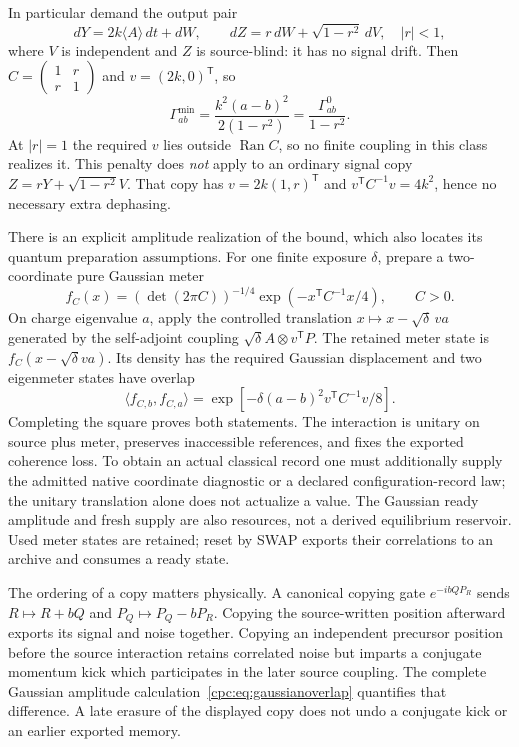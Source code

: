 \documentclass[11pt,oneside,openany]{book}
\theoremstyle{definition}
\theoremstyle{remark}\newtheorem{remark}[theorem]{Remark}
\begin{document}
In particular demand the output pair
\begin{equation}
 dY=2k\langle A\rangle\,dt+dW,\qquad
 dZ=r\,dW+\sqrt{1-r^2}\,dV,
 \quad |r|<1,
 \label{cpc:eq:sourceblind}
\end{equation}
where $V$ is independent and $Z$ is source-blind: it has no signal drift. Then
$C=\left(\begin{smallmatrix}1&r\\r&1\end{smallmatrix}\right)$ and $v=(2k,0)^{\mathsf T}$, so
\begin{equation}
 \Gamma_{ab}^{\min}=\frac{k^2(a-b)^2}{2(1-r^2)}
 =\frac{\Gamma_{ab}^{0}}{1-r^2}.
 \label{cpc:eq:blindcost}
\end{equation}
At $|r|=1$ the required $v$ lies outside $\operatorname{Ran}C$, so no finite coupling in this class realizes it. This penalty does \emph{not} apply to an ordinary signal copy $Z=rY+\sqrt{1-r^2}V$. That copy has $v=2k(1,r)^{\mathsf T}$ and $v^{\mathsf T}C^{-1}v=4k^2$, hence no necessary extra dephasing.

There is an explicit amplitude realization of the bound, which also locates its quantum preparation assumptions. For one finite exposure $\delta$, prepare a two-coordinate pure Gaussian meter
\[
 f_C(x)=(\det(2\pi C))^{-1/4}\exp(-x^{\mathsf T}C^{-1}x/4),\qquad C>0.
\]
On charge eigenvalue $a$, apply the controlled translation $x\mapsto x-\sqrt\delta\,va$ generated by the self-adjoint coupling $\sqrt\delta A\otimes v^{\mathsf T}P$. The retained meter state is $f_C(x-\sqrt\delta va)$. Its density has the required Gaussian displacement and two eigenmeter states have overlap
\begin{equation}
 \langle f_{C,b},f_{C,a}\rangle
 =\exp[-\delta(a-b)^2v^{\mathsf T}C^{-1}v/8].
 \label{cpc:eq:gaussianoverlap}
\end{equation}
Completing the square proves both statements. The interaction is unitary on source plus meter, preserves inaccessible references, and fixes the exported coherence loss. To obtain an actual classical record one must additionally supply the admitted native coordinate diagnostic or a declared configuration-record law; the unitary translation alone does not actualize a value. The Gaussian ready amplitude and fresh supply are also resources, not a derived equilibrium reservoir. Used meter states are retained; reset by SWAP exports their correlations to an archive and consumes a ready state.

The ordering of a copy matters physically. A canonical copying gate $e^{-ibQ P_R}$ sends $R\mapsto R+bQ$ and $P_Q\mapsto P_Q-bP_R$. Copying the source-written position afterward exports its signal and noise together. Copying an independent precursor position before the source interaction retains correlated noise but imparts a conjugate momentum kick which participates in the later source coupling. The complete Gaussian amplitude calculation~\eqref{cpc:eq:gaussianoverlap} quantifies that difference. A late erasure of the displayed copy does not undo a conjugate kick or an earlier exported memory.
\end{document}
